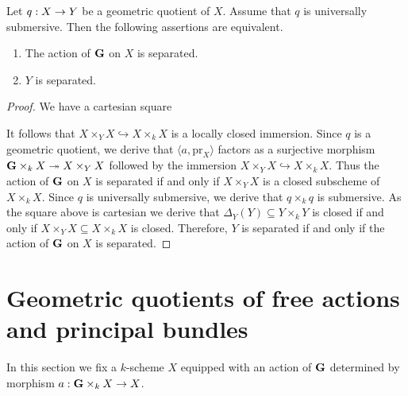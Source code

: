 \begin{theorem}\label{theorem:separatedness_of_universally_submersive_geometric_quotients_of_separated_actions}
Let $q:X\rightarrow Y$ be a geometric quotient of $X$. Assume that $q$ is universally submersive. Then the following assertions are equivalent.
\begin{enumerate}[label=\emph{\textbf{(\roman*)}}, leftmargin=3.0em]
\item The action of $\mathbf{G}$ on $X$ is separated.
\item $Y$ is separated.
\end{enumerate}
\end{theorem}
\begin{proof}
We have a cartesian square
\begin{center}
\end{center}
It follows that $X\times_YX\hookrightarrow X\times_kX$ is a locally closed immersion. Since $q$ is a geometric quotient, we derive  that $\langle a, \mathrm{pr}_X \rangle$ factors as a surjective morphism $\mathbf{G} \times_k X\twoheadrightarrow X\times_YX$ followed by the immersion $X\times_YX\hookrightarrow X\times_kX$. Thus the action of $\mathbf{G}$ on $X$ is separated if and only if $X\times_YX$ is a closed subscheme of $X\times_kX$. Since $q$ is universally submersive, we derive that $q\times_kq$ is submersive. As the square above is cartesian we derive that $\Delta_Y(Y) \subseteq Y\times_kY$ is closed if and only if $X\times_YX\subseteq X\times_kX$ is closed. Therefore, $Y$ is separated if and only if the action of $\mathbf{G}$ on $X$ is separated.
\end{proof}

\section{Geometric quotients of free actions and principal bundles}
\noindent
In this section we fix a $k$-scheme $X$ equipped with an action of $\mathbf{G}$ determined by morphism $a:\mathbf{G}\times_kX\rightarrow X$.

